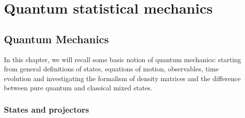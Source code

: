\part{Quantum statistical mechanics}

\chapter{Quantum Mechanics}

    In this chapter, we will recall some basic notion of quantum mechanics: starting from general definitions of states, equations of motion, observables, time evolution and investigating the formalism of density matrices and the difference between pure quantum and classical mixed states.

\section{States and projectors}

